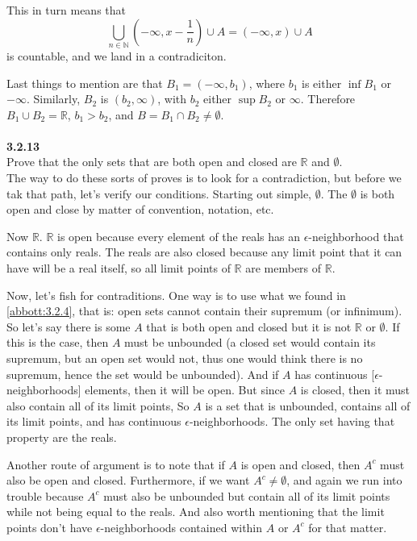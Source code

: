 This in turn means that
$$
\bigcup_{n\in\mathbb{N}} \left(-\infty,x-\frac{1}{n}\right) \cup A = (-\infty,x) \cup A
$$
is countable, and we land in a contradiciton.

Last things to mention are that $B_1 = (-\infty, b_1)$, where $b_1$ is either $\inf B_1$ or $-\infty$.
Similarly, $B_2$ is $(b_2, \infty)$, with $b_2$ either $\sup B_2$ or $\infty$.
Therefore $B_1 \cup B_2 = \mathbb{R}$, $b_1 > b_2$, and $B = B_1 \cap B_2 \neq \emptyset$.
\\~\\



\label{abbott:3.2.13}
\textbf{3.2.13}
\\

Prove that the only sets that are both open and closed are $\mathbb{R}$ and $\emptyset$.
\\

The way to do these sorts of proves is to look for a contradiction, but before we tak that path,
let's verify our conditions.
Starting out simple, $\emptyset$. The $\emptyset$ is both open and close by matter of convention, notation,
etc.

Now $\mathbb{R}$. $\mathbb{R}$ is open because every element of the reals has an $\epsilon$-neighborhood
that contains only reals.
The reals are also closed because any limit point that it can have will be a real itself, so
all limit points of $\mathbb{R}$ are members of $\mathbb{R}$.

Now, let's fish for contraditions.
One way is to use what we found in \ref{abbott:3.2.4}, that is: open sets cannot contain their supremum (or infinimum).
So let's say there is some $A$ that is both open and closed but it is not $\mathbb{R}$ or $\emptyset$.
If this is the case, then $A$ must be unbounded (a closed set would contain its supremum, but an open set would not, thus one would think there is no supremum, hence the set would be unbounded).
And if $A$ has continuous [$\epsilon$-neighborhoods] elements, then it will be open.
But since $A$ is closed, then it must also contain all of its limit points,
So $A$ is a set that is unbounded, contains all of its limit points, and has continuous $\epsilon$-neighborhoods.
The only set having that property are the reals.

Another route of argument is to note that if $A$ is open and closed, then $A^c$ must also be open and closed.
Furthermore, if we want $A^c \neq \emptyset$, and again we run into trouble because $A^c$ must also be unbounded
but contain all of its limit points while not being equal to the reals.
And also worth mentioning that the limit points don't have $\epsilon$-neighborhoods contained within $A$ or $A^c$ for that matter.
\\~\\



